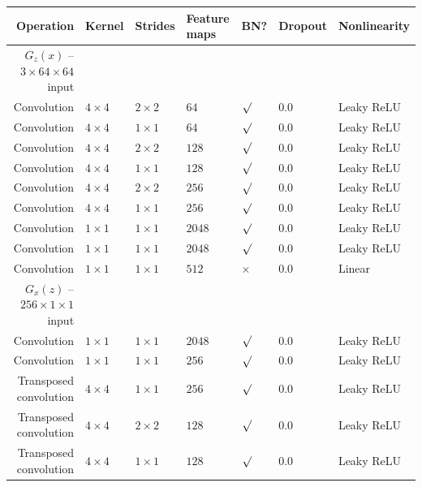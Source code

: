 \documentclass{article}
\begin{document}
\begin{table}[h]
\centering
\begin{tabular}{@{}rllllll@{}} \toprule
Operation              & Kernel       & Strides      & Feature maps & BN?          & Dropout & Nonlinearity \\ \midrule
$G_z(x)$ -- $3 \times 64 \times 64$ input                                                                 \\
Convolution            & $4 \times 4$ & $2 \times 2$ & $64$         & $\surd$      & 0.0     & Leaky ReLU \\
Convolution            & $4 \times 4$ & $1 \times 1$ & $64$         & $\surd$      & 0.0     & Leaky ReLU \\
Convolution            & $4 \times 4$ & $2 \times 2$ & $128$        & $\surd$      & 0.0     & Leaky ReLU \\
Convolution            & $4 \times 4$ & $1 \times 1$ & $128$        & $\surd$      & 0.0     & Leaky ReLU \\
Convolution            & $4 \times 4$ & $2 \times 2$ & $256$        & $\surd$      & 0.0     & Leaky ReLU \\
Convolution            & $4 \times 4$ & $1 \times 1$ & $256$        & $\surd$      & 0.0     & Leaky ReLU \\
Convolution            & $1 \times 1$ & $1 \times 1$ & $2048$       & $\surd$      & 0.0     & Leaky ReLU \\
Convolution            & $1 \times 1$ & $1 \times 1$ & $2048$       & $\surd$      & 0.0     & Leaky ReLU \\
Convolution            & $1 \times 1$ & $1 \times 1$ & $512$        & $\times$     & 0.0     & Linear     \\
$G_x(z)$ -- $256 \times 1 \times 1$ input                                                                 \\
Convolution            & $1 \times 1$ & $1 \times 1$ & $2048$       & $\surd$      & 0.0     & Leaky ReLU \\
Convolution            & $1 \times 1$ & $1 \times 1$ & $256$        & $\surd$      & 0.0     & Leaky ReLU \\
Transposed convolution & $4 \times 4$ & $1 \times 1$ & $256$        & $\surd$      & 0.0     & Leaky ReLU \\
Transposed convolution & $4 \times 4$ & $2 \times 2$ & $128$        & $\surd$      & 0.0     & Leaky ReLU \\
Transposed convolution & $4 \times 4$ & $1 \times 1$ & $128$        & $\surd$      & 0.0     & Leaky ReLU \\

\end{tabular}
\end{table}
\end{document}
